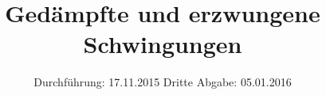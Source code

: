 

\subject{Versuch 354}
\title{Gedämpfte und erzwungene Schwingungen}
\date{
  Durchführung: 17.11.2015
  \hspace{3em}
  Dritte Abgabe: 05.01.2016
  }



\maketitle
\thispagestyle{empty}

\tableofcontents
\newpage

\setcounter{page}{1}






\newpage
\nocite{*}
\printbibliography


